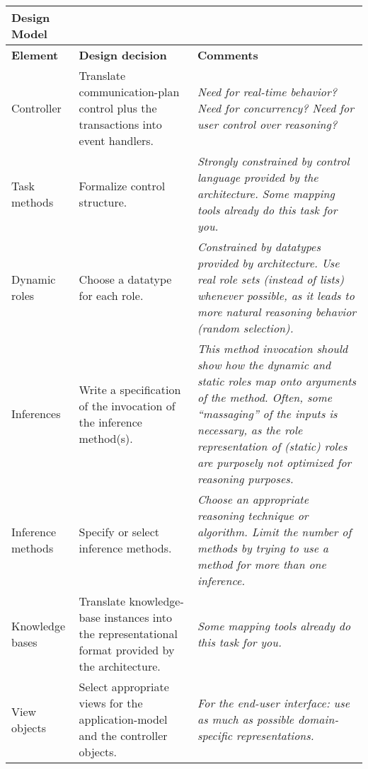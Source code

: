 \begin{tabular}{%
	|>{\colleft}p{2cm}%
	|>{\colleft}p{4.4cm}|
	|>{\colleft}p{4.4cm}|}
\hline
\bf Design Model &
\multicolumn{2}{c}{\bf Worksheet DM-4: Application Design} \\
\hline\hline
\bf Element & \bf Design decision & \bf Comments \\
\hline
\sc Controller & Translate communication-plan control plus the
	transactions  into event handlers. &
	\em 
	Need for real-time behavior? Need for concurrency?
	Need for user control over reasoning?
\\ \hline
\sc Task methods & Formalize control structure. & 
	\em Strongly constrained
	by control language provided by the architecture. 
	Some mapping tools already do this task for you.
\\ \hline
\sc Dynamic roles & Choose a datatype for each role. &
	\em Constrained by datatypes provided by architecture. Use
	real role sets (instead of lists) whenever possible, as it leads to more
	natural reasoning behavior (random selection). 
\\ \hline
\sc Inferences & Write a specification of the 
	invocation of the inference method(s). &
	\em This method invocation should show how the
	dynamic and static roles map onto arguments of the method. 
	Often, some ``massaging'' of the inputs is necessary, as the
	role representation of (static) roles are purposely not
	optimized for reasoning purposes. 
\\ \hline
\sc Inference methods & Specify or select inference methods. &
	\em Choose an appropriate reasoning technique or algorithm. 
	Limit the number of methods by trying to use a method for
	more than one inference. 
\\ \hline
\sc Knowledge bases & Translate knowledge-base instances into the
representational format provided by the architecture. &
	\em Some mapping tools already do this task for you.
\\ \hline
\sc View objects & Select appropriate views for the
	application-model and the controller objects.	&
	\em 	For the end-user interface: use as much as possible
	domain-specific representations. 
\\ \hline
\end{tabular}
